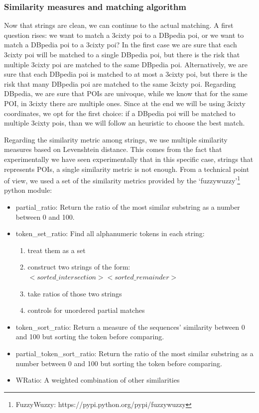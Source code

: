\documentclass[paper=a4, fontsize=11pt]{scrartcl}
\begin{document}
\subsubsection{Similarity measures and matching algorithm}
Now that strings are clean, we can continue to the actual matching. A first question rises: we want to match a 3cixty poi to a DBpedia poi, or we want to match a DBpedia poi to a 3cixty poi? In the first case we are sure that each 3cixty poi will be matched to a single DBpedia poi, but there is the risk that multiple 3cixty poi are matched to the same DBpedia poi. Alternatively, we are sure that each DBpedia poi is matched to at most a 3cixty poi, but there is the risk that many DBpedia poi are matched to the same 3cixty poi.
Regarding DBpedia, we are sure that POIs are univoque, while we know that for the same POI, in 3cixty there are multiple ones.
Since at the end we will be using 3cixty coordinates, we opt for the first choice: if a DBpedia poi will be matched to multiple 3cixty pois, than we will follow an heuristic to choose the best match.

Regarding the similarity metric among strings, we use multiple similarity measures based on Levenshtein distance. This comes from the fact that experimentally we have seen experimentally that in this specific case, strings that represents POIs, a single similarity metric is not enough. From a technical point of view, we used a set of the similarity metrics provided by the `fuzzywuzzy'\footnote{FuzzyWuzzy: https://pypi.python.org/pypi/fuzzywuzzy} python module:
\begin{itemize}
\item partial\_ratio: Return the ratio of the most similar substring
    as a number between 0 and 100.
\item token\_set\_ratio: Find all alphanumeric tokens in each string:
\begin{enumerate}
\item treat them as a set
\item construct two strings of the form: $<sorted\_intersection> <sorted\_remainder>$
\item take ratios of those two strings
\item controls for unordered partial matches
\end{enumerate}
      
\item token\_sort\_ratio: Return a measure of the sequences' similarity between 0 and 100
    but sorting the token before comparing.
\item partial\_token\_sort\_ratio: Return the ratio of the most similar substring as a number between 0 and 100 but sorting the token before comparing.

\item WRatio: A weighted combination of other similarities
\end{itemize}
\end{document}

